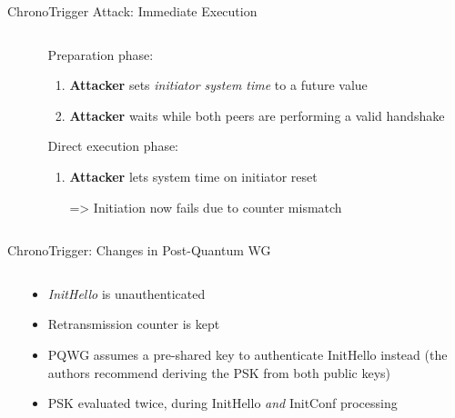 \begin{frame}{ChronoTrigger Attack: Immediate Execution}
\begin{columns}[fullwidth,T]
  \begin{column}{.5\linewidth}
  \end{column}

  \begin{column}{.46\linewidth}
    \small\leavevmode
      \begin{enumblock}{Preparation phase:}
      \begin{enumerate}
        \item \textbf{Attacker} sets \emph{initiator system time} to a future value
        \item \textbf{Attacker} waits while both peers are performing a valid handshake
      \end{enumerate}
      \end{enumblock}
      \begin{enumblock}{Direct execution phase:}
      \begin{enumerate}
        \item \textbf{Attacker} lets system time on initiator reset
        \item[=>] Initiation now fails due to counter mismatch
      \end{enumerate}
      \end{enumblock}
  \end{column}
\end{columns}
\end{frame}

\begin{frame}{ChronoTrigger: Changes in Post-Quantum WG}
  \begin{columns}[fullwidth,T]
    \begin{column}{.5\linewidth}
    \end{column}

    \begin{column}{.46\linewidth}
      \begin{itemize}
        \item \emph{InitHello} is unauthenticated
        \item Retransmission counter is kept
        \item PQWG assumes a pre-shared key to authenticate InitHello instead (the authors recommend deriving the PSK from both public keys)
        \item PSK evaluated twice, during InitHello \emph{and} InitConf processing
      \end{itemize}
    \end{column}
  \end{columns}
\end{frame}

